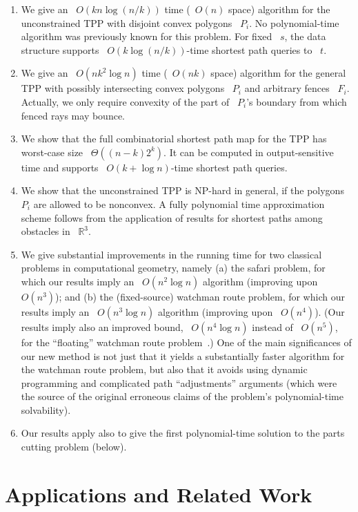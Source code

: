 \documentclass[11pt]{article}
\begin{document}
\begin{enumerate}
	\item We give an ~\(O(kn\log(n/k))\) time (~\(O(n)\) space) algorithm for the unconstrained TPP with disjoint convex polygons ~\(P_i\). No polynomial-time algorithm was previously known for this problem. For fixed ~\(s\), the data structure supports ~\(O(k\log(n/k))\)-time shortest path queries to ~\(t\).
	\item We give an ~\(O(nk^2\log n)\) time (~\(O(nk)\) space) algorithm for the general TPP with possibly intersecting convex polygons ~\(P_i\) and arbitrary fences ~\(F_i\). Actually, we only require convexity of the part of ~\(P_i\)'s boundary from which fenced rays may bounce.
	\item We show that the full combinatorial shortest path map for the TPP has worst-case size ~\(\Theta((n-k)2^k)\). It can be computed in output-sensitive time and supports ~\(O(k + \log n)\)-time shortest path queries.
	\item We show that the unconstrained TPP is NP-hard in general, if the polygons ~\(P_i\) are allowed to be nonconvex. A fully polynomial time approximation scheme follows from the application of results for shortest paths among obstacles in ~\(\mathbb{R}^3\).
	\item We give substantial improvements in the running time for two classical problems in computational geometry, namely (a) the safari problem, for which our results imply an ~\(O(n^2\log n)\) algorithm (improving upon ~\(O(n^3)\)); and (b) the (fixed-source) watchman route problem, for which our results imply an ~\(O(n^3\log n)\) algorithm (improving upon ~\(O(n^4)\)).
	(Our results imply also an improved bound, ~\(O(n^4\log n)\) instead of ~\(O(n^5)\), for the ``floating'' watchman route problem~\cite{ref26}.)
	One of the main significances of our new method is not just that it yields a substantially faster algorithm for the watchman route problem, but also that it avoids using dynamic programming and complicated path ``adjustments'' arguments (which were the source of the original erroneous claims of the problem's polynomial-time solvability).
	\item Our results apply also to give the first polynomial-time solution to the parts cutting problem (below).
\end{enumerate}

\section{Applications and Related Work}
\end{document}
